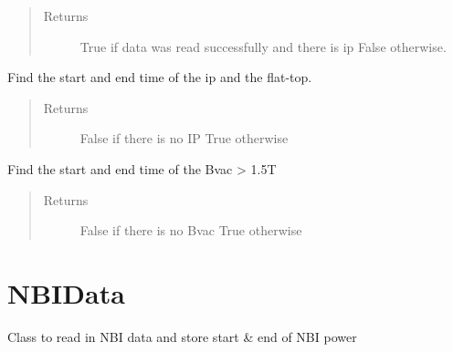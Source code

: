 \documentclass[letterpaper,10pt,english]{sphinxmanual}
\begin{document}
\begin{fulllineitems}
\begin{fulllineitems}
\begin{quote}
\begin{description}
\item[{Returns}] \leavevmode
True if data was read successfully and there is ip
False otherwise.

\end{description}\end{quote}

\end{fulllineitems}


\begin{fulllineitems}
\label{mag_data:mag_data.MagData._find_ip_times}
Find the start and end time of
the ip and the flat-top.
\begin{quote}\begin{description}
\item[{Returns}] \leavevmode
False if there is no IP
True otherwise

\end{description}\end{quote}

\end{fulllineitems}


\begin{fulllineitems}
\label{mag_data:mag_data.MagData._find_bvac_times}
Find the start and end time of
the Bvac \textgreater{} 1.5T
\begin{quote}\begin{description}
\item[{Returns}] \leavevmode
False if there is no Bvac
True otherwise

\end{description}\end{quote}

\end{fulllineitems}


\end{fulllineitems}



\section{NBIData}
\label{nbi_data:nbidata}\label{nbi_data:module-nbi_data}\label{nbi_data::doc}
Class to read in NBI data and store start \& end of NBI power
\end{document}
